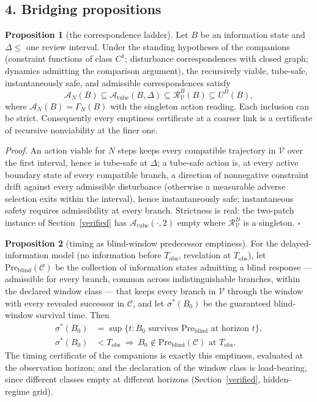 \documentclass[10pt,twocolumn]{article}
\theoremstyle{definition}
\newtheorem{proposition}{Proposition}
\begin{document}
\subsection{4. Bridging propositions}\label{bridges}

\begin{proposition}[the correspondence ladder]\label{prop:ladder}
Let \(B\) be an information state and \(\Delta \le\) one review interval.
Under the standing hypotheses of the companions (constraint functions of
class \(C^1\); disturbance correspondences with closed graph; dynamics
admitting the comparison argument), the recursively viable, tube-safe,
instantaneously safe, and admissible correspondences satisfy
\[
\mathcal{A}_{N}(B) \subseteq \mathcal{A}_{\mathrm{tube}}(B, \Delta)
\subseteq \mathcal{R}^{B}_{\mathcal{V}}(B) \subseteq U^{B}(B),
\]
where \(\mathcal{A}_{N}(B) = \Gamma_{N}(B)\) with the singleton action
reading. Each inclusion can be strict. Consequently every emptiness
certificate at a coarser link is a certificate of recursive nonviability at
the finer one.
\end{proposition}

\emph{Proof.} An action viable for \(N\) steps keeps every compatible
trajectory in \(\mathcal{V}\) over the first interval, hence is tube-safe at
\(\Delta\); a tube-safe action is, at every active boundary state of every
compatible branch, a direction of nonnegative constraint drift against
every admissible disturbance (otherwise a measurable adverse selection
exits within the interval), hence instantaneously safe; instantaneous safety
requires admissibility at every branch. Strictness is real: the two-patch
instance of Section~\ref{verified} has
\(\mathcal{A}_{\mathrm{tube}}(\cdot, 2)\) empty where
\(\mathcal{R}^{B}_{\mathcal{V}}\) is a singleton. \hfill\(\square\)

\begin{proposition}[timing as blind-window predecessor emptiness]\label{prop:timing}
For the delayed-information model (no information before \(T_{\mathrm{obs}}\),
revelation at \(T_{\mathrm{obs}}\)), let
\(\mathrm{Pre}_{\mathrm{blind}}(\mathscr{C})\) be the collection of
information states admitting a blind response --- admissible for every
branch, common across indistinguishable branches, within the declared
window class --- that keeps every branch in \(\mathcal{V}\) through the
window with every revealed successor in \(\mathscr{C}\), and let
\(\sigma^{*}(B_0)\) be the guaranteed blind-window survival time. Then
\begin{align*}
\sigma^{*}(B_0) &= \sup \{ t : B_0 \text{ survives } \mathrm{Pre}_{\mathrm{blind}}
\text{ at horizon } t \}, \\
\sigma^{*}(B_0) &< T_{\mathrm{obs}} \ \Longrightarrow\ B_0 \notin
\mathrm{Pre}_{\mathrm{blind}}(\mathscr{C}) \text{ at } T_{\mathrm{obs}}.
\end{align*}
The timing certificate of the companions is exactly this emptiness, evaluated
at the observation horizon; and the declaration of the window class is
load-bearing, since different classes empty at different horizons
(Section~\ref{verified}, hidden-regime grid).
\end{proposition}
\end{document}
